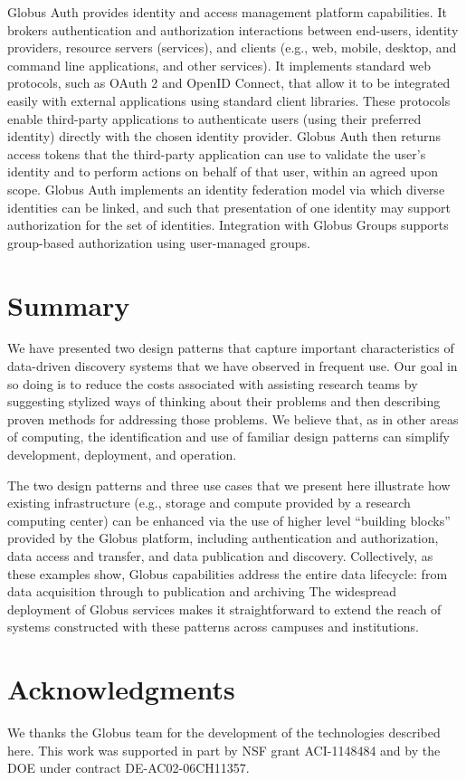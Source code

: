 \documentclass[10pt]{article}
\begin{document}
Globus Auth provides identity and access management platform capabilities. It brokers authentication and authorization interactions between end-users, identity providers, resource servers (services), and clients (e.g., web, mobile, desktop, and command line applications, and other services). 
It implements standard web protocols, such as OAuth 2 and OpenID Connect, that allow it to be integrated easily with external applications using standard client libraries. 
These protocols enable third-party applications to authenticate users (using their preferred identity) directly with the chosen identity provider. Globus Auth then returns access
tokens that the third-party application can use to validate the user's identity and to perform actions on behalf of that user, within an agreed upon scope. Globus Auth implements an identity federation model via which diverse identities can be linked, and such that presentation of one identity may support authorization for the set of identities. Integration with Globus Groups supports group-based authorization using user-managed groups.

\section*{Summary}

We have presented two design patterns that capture important characteristics of 
data-driven discovery systems that we have observed in frequent use. 
Our goal in so doing is to reduce the costs associated with assisting research teams
by suggesting stylized ways of thinking about their problems and then describing
proven methods for addressing those problems.
We believe that, as in other areas of computing, 
the identification and use of familiar design patterns 
can simplify development, deployment, and operation.

% 

The two design patterns and three use cases that we present here
illustrate how existing infrastructure (e.g., storage and compute provided by a research computing center) can be enhanced via the use of higher level ``building blocks'' provided by the Globus platform, including authentication and authorization, data access and transfer, and data publication and discovery. 
Collectively, as these examples show, Globus capabilities address the entire data lifecycle: from data acquisition through to publication and archiving 
The widespread deployment of Globus services makes it straightforward to extend
the reach of systems constructed with these patterns across campuses and institutions.


\section*{Acknowledgments}

We thanks the Globus team for the development of the technologies described here.
This work was supported in part by NSF grant ACI-1148484 and by the DOE under contract DE-AC02-06CH11357.

\small


\end{document}
